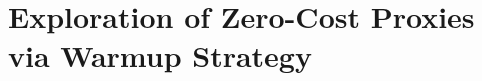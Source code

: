 \begin{comment}
\subsection{Theoretical Foundation}

Noen tanker her:
- Warmup som det blir referert til her blir ikke brukt slik i artikkelen som det står
"Generally speaking, by warmup we mean using the zero-cost proxies at the beginning of the search
process to initialize the search algorithm without training any models or using accuracy"
Warmup, originally used in neural network training, refers to the gradual increase of the learning rate during the initial training phase, which aids in achieving better convergence and stabilizing training dynamics \autocite{GoyalDGNWKTJH17}. In \cite{abdelfattah2021zero}, warmup is referred to as using zeor-cost proxies at the start of the search without training any models or using any accuracy.  

The warmup concept has been adapted to zero-cost proxies by \autocite{abdelfattah2021zero} to improve performance estimation in NAS.

The motivation behind applying warmup to zero-cost proxies in NAS is to capitalize on early training dynamics to enhance the precision and dependability of performance estimation. This approach involves training the candidate architectures for a finite number of warmup epochs and computing the zero-cost proxies at each epoch. By pinpointing the optimal warmup point, the NAS process can be steered towards more favorable architectures, subsequently minimizing search time and boosting overall efficiency.

The value of warmup in the realm of zero-cost proxies can be ascribed to several factors. Firstly, it facilitates the incorporation of early training dynamics into the performance estimation process, providing crucial insights into the potential performance of an architecture. Secondly, warmup allows for network performance estimation without fully training the networks, substantially alleviating the computational workload. Lastly, the warmup method emphasizes determining the epoch with the highest correlation between the zero-cost proxies and the final network performance, as measured by validation accuracy, leading to a more precise and reliable performance predictor.
\end{comment}

\section{Exploration of Zero-Cost Proxies via Warmup Strategy}
